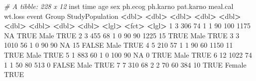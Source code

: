 \documentclass[
]{article}
\newenvironment{Shaded}{\begin{snugshade}}{\end{snugshade}}
\newcommand{\CommentTok}[1]{\textcolor[rgb]{0.56,0.35,0.01}{\textit{#1}}}
\newcommand{\ConstantTok}[1]{\textcolor[rgb]{0.56,0.35,0.01}{#1}}
\newcommand{\DecValTok}[1]{\textcolor[rgb]{0.00,0.00,0.81}{#1}}
\newcommand{\ErrorTok}[1]{\textcolor[rgb]{0.64,0.00,0.00}{\textbf{#1}}}
\newcommand{\NormalTok}[1]{#1}
\newcommand{\SpecialCharTok}[1]{\textcolor[rgb]{0.81,0.36,0.00}{\textbf{#1}}}
\begin{document}
\begin{Shaded}
\begin{Highlighting}[]
\CommentTok{\# A tibble: 228 x 12}
\NormalTok{   inst  time   age   sex ph.ecog ph.karno pat.karno meal.cal wt.loss event Group  StudyPopulation}
  \SpecialCharTok{\textless{}}\NormalTok{dbl}\SpecialCharTok{\textgreater{}} \ErrorTok{\textless{}}\NormalTok{dbl}\SpecialCharTok{\textgreater{}} \ErrorTok{\textless{}}\NormalTok{dbl}\SpecialCharTok{\textgreater{}} \ErrorTok{\textless{}}\NormalTok{dbl}\SpecialCharTok{\textgreater{}}   \ErrorTok{\textless{}}\NormalTok{dbl}\SpecialCharTok{\textgreater{}}    \ErrorTok{\textless{}}\NormalTok{dbl}\SpecialCharTok{\textgreater{}}     \ErrorTok{\textless{}}\NormalTok{dbl}\SpecialCharTok{\textgreater{}}    \ErrorTok{\textless{}}\NormalTok{dbl}\SpecialCharTok{\textgreater{}}   \ErrorTok{\textless{}}\NormalTok{dbl}\SpecialCharTok{\textgreater{}} \ErrorTok{\textless{}}\NormalTok{lgl}\SpecialCharTok{\textgreater{}} \ErrorTok{\textless{}}\NormalTok{fct}\SpecialCharTok{\textgreater{}}  \ErrorTok{\textless{}}\NormalTok{lgl}\SpecialCharTok{\textgreater{}}          
\DecValTok{1}     \DecValTok{3}   \DecValTok{306}    \DecValTok{74}     \DecValTok{1}       \DecValTok{1}       \DecValTok{90}       \DecValTok{100}     \DecValTok{1175}      \ConstantTok{NA} \ConstantTok{TRUE}\NormalTok{  Male   }\ConstantTok{TRUE}           
\DecValTok{2}     \DecValTok{3}   \DecValTok{455}    \DecValTok{68}     \DecValTok{1}       \DecValTok{0}       \DecValTok{90}        \DecValTok{90}     \DecValTok{1225}      \DecValTok{15} \ConstantTok{TRUE}\NormalTok{  Male   }\ConstantTok{TRUE}           
\DecValTok{3}     \DecValTok{3}  \DecValTok{1010}    \DecValTok{56}     \DecValTok{1}       \DecValTok{0}       \DecValTok{90}        \DecValTok{90}       \ConstantTok{NA}      \DecValTok{15} \ConstantTok{FALSE}\NormalTok{ Male   }\ConstantTok{TRUE}           
\DecValTok{4}     \DecValTok{5}   \DecValTok{210}    \DecValTok{57}     \DecValTok{1}       \DecValTok{1}       \DecValTok{90}        \DecValTok{60}     \DecValTok{1150}      \DecValTok{11} \ConstantTok{TRUE}\NormalTok{  Male   }\ConstantTok{TRUE}           
\DecValTok{5}     \DecValTok{1}   \DecValTok{883}    \DecValTok{60}     \DecValTok{1}       \DecValTok{0}      \DecValTok{100}        \DecValTok{90}       \ConstantTok{NA}       \DecValTok{0} \ConstantTok{TRUE}\NormalTok{  Male   }\ConstantTok{TRUE}           
\DecValTok{6}    \DecValTok{12}  \DecValTok{1022}    \DecValTok{74}     \DecValTok{1}       \DecValTok{1}       \DecValTok{50}        \DecValTok{80}      \DecValTok{513}       \DecValTok{0} \ConstantTok{FALSE}\NormalTok{ Male   }\ConstantTok{TRUE}           
\DecValTok{7}     \DecValTok{7}   \DecValTok{310}    \DecValTok{68}     \DecValTok{2}       \DecValTok{2}       \DecValTok{70}        \DecValTok{60}      \DecValTok{384}      \DecValTok{10} \ConstantTok{TRUE}\NormalTok{  Female }\ConstantTok{TRUE}           

\end{Highlighting}
\end{Shaded}
\end{document}
